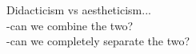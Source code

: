 Didacticism vs aestheticism...\\
-can we combine the two?\\
-can we completely separate the two?\\











